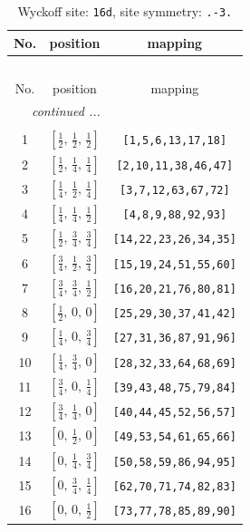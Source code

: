 \documentclass[fleqn,8pt]{jsarticle}
\begin{document}
\renewcommand{\arraystretch}{1.2}
\begin{longtable}{ccc}
\caption{Wyckoff site: {\tt 16d}, site symmetry: {\tt .-3.}}
 \\
 \hline \hline
No. & position & mapping \\ \hline \endfirsthead

\multicolumn{2}{l}{\tablename\ \thetable{}} \\
 \hline \hline
No. & position & mapping \\ \hline \endhead

 \hline \hline
\multicolumn{2}{r}{\footnotesize\it continued ...} \\ \endfoot

 \hline \hline
\multicolumn{2}{r}{} \\ \endlastfoot

1 & $\left[ \frac{1}{2},\, \frac{1}{2},\, \frac{1}{2} \right]$ & {\tt [1,5,6,13,17,18]} \\ \hline
2 & $\left[ \frac{1}{2},\, \frac{1}{4},\, \frac{1}{4} \right]$ & {\tt [2,10,11,38,46,47]} \\ \hline
3 & $\left[ \frac{1}{4},\, \frac{1}{2},\, \frac{1}{4} \right]$ & {\tt [3,7,12,63,67,72]} \\ \hline
4 & $\left[ \frac{1}{4},\, \frac{1}{4},\, \frac{1}{2} \right]$ & {\tt [4,8,9,88,92,93]} \\ \hline
5 & $\left[ \frac{1}{2},\, \frac{3}{4},\, \frac{3}{4} \right]$ & {\tt [14,22,23,26,34,35]} \\ \hline
6 & $\left[ \frac{3}{4},\, \frac{1}{2},\, \frac{3}{4} \right]$ & {\tt [15,19,24,51,55,60]} \\ \hline
7 & $\left[ \frac{3}{4},\, \frac{3}{4},\, \frac{1}{2} \right]$ & {\tt [16,20,21,76,80,81]} \\ \hline
8 & $\left[ \frac{1}{2},\, 0,\, 0 \right]$ & {\tt [25,29,30,37,41,42]} \\ \hline
9 & $\left[ \frac{1}{4},\, 0,\, \frac{3}{4} \right]$ & {\tt [27,31,36,87,91,96]} \\ \hline
10 & $\left[ \frac{1}{4},\, \frac{3}{4},\, 0 \right]$ & {\tt [28,32,33,64,68,69]} \\ \hline
11 & $\left[ \frac{3}{4},\, 0,\, \frac{1}{4} \right]$ & {\tt [39,43,48,75,79,84]} \\ \hline
12 & $\left[ \frac{3}{4},\, \frac{1}{4},\, 0 \right]$ & {\tt [40,44,45,52,56,57]} \\ \hline
13 & $\left[ 0,\, \frac{1}{2},\, 0 \right]$ & {\tt [49,53,54,61,65,66]} \\ \hline
14 & $\left[ 0,\, \frac{1}{4},\, \frac{3}{4} \right]$ & {\tt [50,58,59,86,94,95]} \\ \hline
15 & $\left[ 0,\, \frac{3}{4},\, \frac{1}{4} \right]$ & {\tt [62,70,71,74,82,83]} \\ \hline
16 & $\left[ 0,\, 0,\, \frac{1}{2} \right]$ & {\tt [73,77,78,85,89,90]} \\
\end{longtable}
\end{document}
